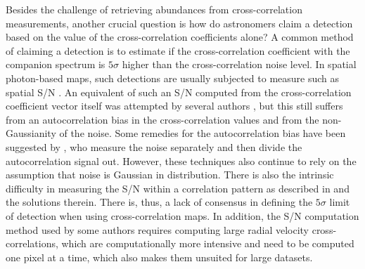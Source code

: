 \documentclass[referee]{aa} %
\begin{document}
Besides the challenge of retrieving abundances from cross-correlation measurements, another crucial question is how do astronomers claim a detection based on the value of the cross-correlation coefficients alone?
A common method of claiming a detection is to estimate if the cross-correlation coefficient with the companion spectrum is $5\sigma$ higher than the cross-correlation noise level.
In spatial photon-based maps, such detections are usually subjected to measure such as spatial S/N \citep[][]{2014MawetSNR}.
An equivalent of such an S/N computed from the cross-correlation coefficient vector itself was attempted by several authors \citep[e.g.,][]{2018AHoeijmakersMM}, but this still suffers from an autocorrelation bias in the cross-correlation values and from the non-Gaussianity of the noise.
Some remedies for the autocorrelation bias have been suggested by \citet[][]{ruffio2019radial}, who measure the noise separately and then divide the autocorrelation signal out.
However, these techniques also continue to rely on the assumption that noise is Gaussian in distribution.
There is also the intrinsic difficulty in measuring the S/N within a correlation pattern as described in \cite{2023Malin} and the solutions therein. There is, thus, a lack of consensus in defining the $5\sigma$ limit of detection when using cross-correlation maps.
In addition, the S/N computation method used by some authors \citep[e.g in][]{2021Cugno} requires computing large radial velocity cross-correlations, which are computationally more intensive and need to be computed one pixel at a time, which also makes them unsuited for large datasets.
\end{document}
